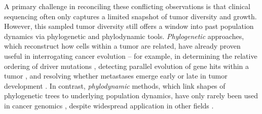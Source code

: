 \documentclass[12pt]{elife_based}
\begin{document}
A primary challenge in reconciling these conflicting observations is that clinical sequencing often only captures a limited snapshot of tumor diversity and growth. However, this sampled tumor diversity still offers a window into past population dynamics via phylogenetic and phylodynamic tools. \textit{Phylogenetic} approaches, which reconstruct how cells within a tumor are related, have already proven useful in interrogating cancer evolution -- for example, in determining the relative ordering of driver mutations \citep{gerlinger2012intratumor, kim2014using}, detecting parallel evolution of gene hits within a tumor \citep{turajlic2018tracking, turati2021chemotherapy}, and resolving whether metastases emerge early or late in tumor development \citep{leung2017single, hu2019quantitative}. 
In contrast, \textit{phylodynamic} methods, which link shapes of phylogenetic trees to underlying population dynamics, have only rarely been used in cancer genomics \citep{Alves:2019wk}, despite widespread application in other fields \citep{Stadler2021, Attwood2022}. %
\end{document}
